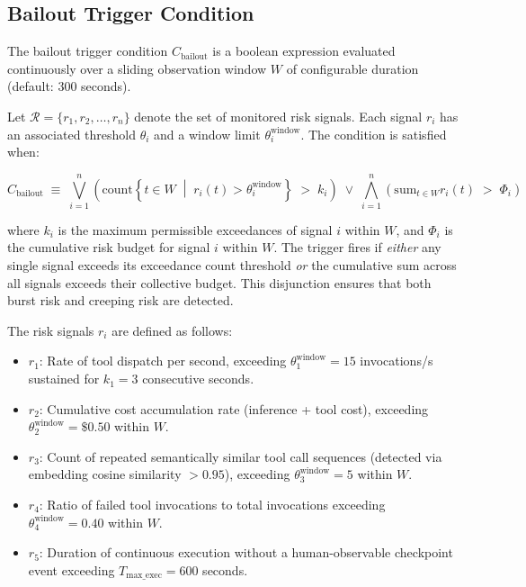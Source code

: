 \bigskip

\subsection{Bailout Trigger Condition}

The bailout trigger condition $C_{\text{bailout}}$ is a boolean expression evaluated continuously over a sliding observation window $W$ of configurable duration (default: 300 seconds).

Let $\mathcal{R} = \{r_1, r_2, \ldots, r_n\}$ denote the set of monitored risk signals. Each signal $r_i$ has an associated threshold $\theta_i$ and a window limit $\theta_i^{\text{window}}$. The condition is satisfied when:

\[
C_{\text{bailout}} \;\equiv\;
\bigvee_{i=1}^{n} \left(
  \text{count}\left\{t \in W \;\middle|\; r_i(t) > \theta_i^{\text{window}}\right\}
  \;>\; k_i
\right)
\;\lor\;
\bigwedge_{i=1}^{n} \left(
  \text{sum}_{t \in W} r_i(t) \;>\; \Phi_i
\right)
\]

where $k_i$ is the maximum permissible exceedances of signal $i$ within $W$, and $\Phi_i$ is the cumulative risk budget for signal $i$ within $W$. The trigger fires if \textit{either} any single signal exceeds its exceedance count threshold \textit{or} the cumulative sum across all signals exceeds their collective budget. This disjunction ensures that both burst risk and creeping risk are detected.

\bigskip

The risk signals $r_i$ are defined as follows:

\begin{itemize}
  \item $r_1$: Rate of tool dispatch per second, exceeding $\theta_1^{\text{window}} = 15$ invocations/s sustained for $k_1 = 3$ consecutive seconds.
  \item $r_2$: Cumulative cost accumulation rate (inference + tool cost), exceeding $\theta_2^{\text{window}} = \$0.50$ within $W$.
  \item $r_3$: Count of repeated semantically similar tool call sequences (detected via embedding cosine similarity $> 0.95$), exceeding $\theta_3^{\text{window}} = 5$ within $W$.
  \item $r_4$: Ratio of failed tool invocations to total invocations exceeding $\theta_4^{\text{window}} = 0.40$ within $W$.
  \item $r_5$: Duration of continuous execution without a human-observable checkpoint event exceeding $T_{\text{max\_exec}} = 600$ seconds.
\end{itemize}

